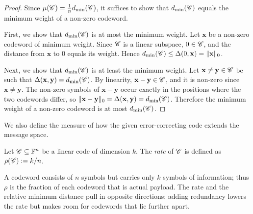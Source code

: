\documentclass[../../book]{subfiles}
\begin{document}
\begin{proof}
  Since $\mu(\mathscr{C}) = \frac{1}{n} d_{\min}(\mathscr{C})$, it suffices to show that $d_{\min}(\mathscr{C})$ equals the minimum weight of a non-zero codeword.

  First, we show that $d_{\min}(\mathscr{C})$ is at most the minimum weight. Let $\mathbf{x}$ be a non-zero codeword of minimum weight. Since $\mathscr{C}$ is a linear subspace, $0 \in \mathscr{C}$, and the distance from $\mathbf{x}$ to $0$ equals its weight. Hence $d_{\min}(\mathscr{C}) \leq \Delta(0, \mathbf{x}) = \|\mathbf{x}\|_0$.

  Next, we show that $d_{\min}(\mathscr{C})$ is at least the minimum weight. Let $\mathbf{x} \neq \mathbf{y} \in \mathscr{C}$ be such that $\Delta(\mathbf{x}, \mathbf{y}) = d_{\min}(\mathscr{C})$. By linearity, $\mathbf{x} - \mathbf{y} \in \mathscr{C}$, and it is non-zero since $\mathbf{x} \neq \mathbf{y}$. The non-zero symbols of $\mathbf{x} - \mathbf{y}$ occur exactly in the positions where the two codewords differ, so $\|\mathbf{x} - \mathbf{y}\|_0 = \Delta(\mathbf{x}, \mathbf{y}) = d_{\min}(\mathscr{C})$. Therefore the minimum weight of a non-zero codeword is at most $d_{\min}(\mathscr{C})$.
\end{proof}

We also define the measure of how the given error-correcting code extends the message space.

\begin{definition}[Rate]\label{def:rate}
  Let $\mathscr{C} \subseteq \mathbb{F}^n$ be a linear code of dimension $k$. The \emph{rate} of $\mathscr{C}$ is defined as $\rho(\mathscr{C}) := k/n$.
\end{definition}

A codeword consists of $n$ symbols but carries only $k$ symbols of information; thus $\rho$ is the fraction of each codeword that is actual payload. The rate and the relative minimum distance pull in opposite directions: adding redundancy lowers the rate but makes room for codewords that lie further apart.
\end{document}

